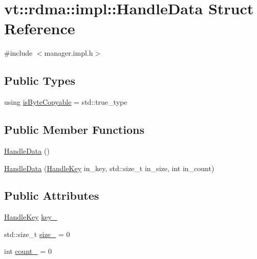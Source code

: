 \hypertarget{structvt_1_1rdma_1_1impl_1_1_handle_data}{}\section{vt\+:\+:rdma\+:\+:impl\+:\+:Handle\+Data Struct Reference}
\label{structvt_1_1rdma_1_1impl_1_1_handle_data}


{\ttfamily \#include $<$manager.\+impl.\+h$>$}

\subsection*{Public Types}
\begin{DoxyCompactItemize}
\item 
using \hyperlink{structvt_1_1rdma_1_1impl_1_1_handle_data_a1178bd6a0f3adfaa3fc2dfed97e65fa7}{is\+Byte\+Copyable} = std\+::true\+\_\+type
\end{DoxyCompactItemize}
\subsection*{Public Member Functions}
\begin{DoxyCompactItemize}
\item 
\hyperlink{structvt_1_1rdma_1_1impl_1_1_handle_data_adb5fa646ed809e1eee6dc1b3a92c53a1}{Handle\+Data} ()
\item 
\hyperlink{structvt_1_1rdma_1_1impl_1_1_handle_data_ad824b76d3324b98059f8708d8e0823e4}{Handle\+Data} (\hyperlink{structvt_1_1rdma_1_1_handle_key}{Handle\+Key} in\+\_\+key, std\+::size\+\_\+t in\+\_\+size, int in\+\_\+count)
\end{DoxyCompactItemize}
\subsection*{Public Attributes}
\begin{DoxyCompactItemize}
\item 
\hyperlink{structvt_1_1rdma_1_1_handle_key}{Handle\+Key} \hyperlink{structvt_1_1rdma_1_1impl_1_1_handle_data_a7dce9ae3b0d1704b479feb32063efee0}{key\+\_\+}
\item 
std\+::size\+\_\+t \hyperlink{structvt_1_1rdma_1_1impl_1_1_handle_data_a2a540d55d5fff52c4de6e677892f6374}{size\+\_\+} = 0
\item 
int \hyperlink{structvt_1_1rdma_1_1impl_1_1_handle_data_ae4c0e267300c40b8de9233c0e968d1ad}{count\+\_\+} = 0
\end{DoxyCompactItemize}
